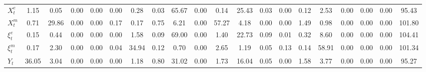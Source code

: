 \begin{center}
\begin{longtable}{lccccccccccccccccccc}
$ X^e_t                     $	 & 	                1.15	 & 	                0.05	 & 	                0.00	 & 	                0.00	 & 	                0.00	 & 	                0.28	 & 	                0.03	 & 	               65.67	 & 	                0.00	 & 	                0.14	 & 	               25.43	 & 	                0.03	 & 	                0.00	 & 	                0.12	 & 	                2.53	 & 	                0.00	 & 	                0.00	 & 	                0.00	 & 	               95.43 \\ 
$ X^m_t                     $	 & 	                0.71	 & 	               29.86	 & 	                0.00	 & 	                0.00	 & 	                0.17	 & 	                0.17	 & 	                0.75	 & 	                6.21	 & 	                0.00	 & 	               57.27	 & 	                4.18	 & 	                0.00	 & 	                0.00	 & 	                1.49	 & 	                0.98	 & 	                0.00	 & 	                0.00	 & 	                0.00	 & 	              101.80 \\ 
$ \xi^e_t                   $	 & 	                0.15	 & 	                0.44	 & 	                0.00	 & 	                0.00	 & 	                0.00	 & 	                1.58	 & 	                0.09	 & 	               69.00	 & 	                0.00	 & 	                1.40	 & 	               22.73	 & 	                0.09	 & 	                0.01	 & 	                0.32	 & 	                8.60	 & 	                0.00	 & 	                0.00	 & 	                0.00	 & 	              104.41 \\ 
$  \xi^m_t                  $	 & 	                0.17	 & 	                2.30	 & 	                0.00	 & 	                0.00	 & 	                0.04	 & 	               34.94	 & 	                0.12	 & 	                0.70	 & 	                0.00	 & 	                2.65	 & 	                1.19	 & 	                0.05	 & 	                0.13	 & 	                0.14	 & 	               58.91	 & 	                0.00	 & 	                0.00	 & 	                0.00	 & 	              101.34 \\ 
$ Y_t                       $	 & 	               36.05	 & 	                3.04	 & 	                0.00	 & 	                0.00	 & 	                0.00	 & 	                1.18	 & 	                0.80	 & 	               31.02	 & 	                0.00	 & 	                1.73	 & 	               16.04	 & 	                0.05	 & 	                0.00	 & 	                1.58	 & 	                3.77	 & 	                0.00	 & 	                0.00	 & 	                0.00	 & 	               95.27 \\ 

\end{longtable}
\end{center}
